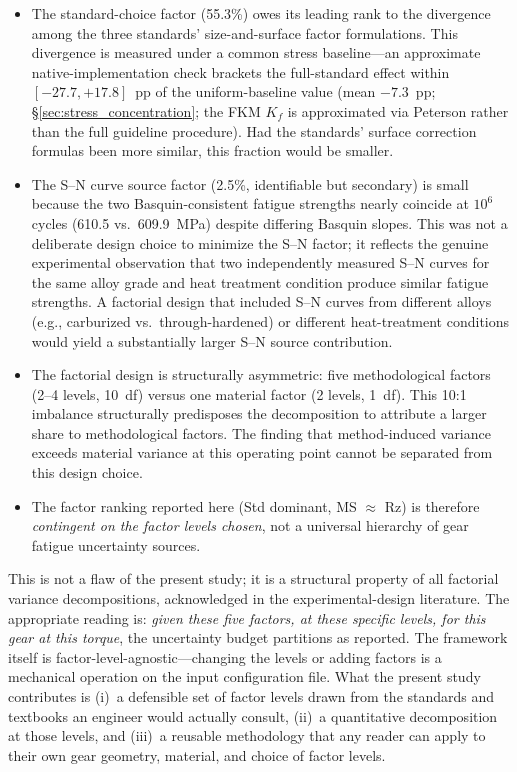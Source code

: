\documentclass[twocolumn,12pt,a4paper]{article}
\begin{document}
\begin{itemize}
  \item The standard-choice factor (55.3\%) owes its leading rank to the
        divergence among the three standards' size-and-surface factor
        formulations. This divergence is measured under a common stress
        baseline---an approximate native-implementation check brackets
        the full-standard effect within $[-27.7, +17.8]$~pp of the
        uniform-baseline value (mean $-7.3$~pp;
        \S\ref{sec:stress_concentration}; the FKM $K_f$ is
        approximated via Peterson rather than the full guideline
        procedure). Had the standards' surface
        correction formulas been more similar, this fraction would be
        smaller.

  \item The S--N curve source factor (2.5\%, identifiable but
        secondary) is small because the two Basquin-consistent
        fatigue strengths nearly coincide at $10^6$ cycles (610.5 vs.\
        609.9~MPa) despite differing Basquin slopes.
        This was not a deliberate design choice to minimize the S--N
        factor; it reflects the genuine experimental observation that two
        independently measured S--N curves for the same alloy grade and
        heat treatment condition produce similar fatigue strengths.
        A factorial design that included S--N curves from
        different alloys (e.g., carburized vs.\ through-hardened) or
        different heat-treatment conditions would yield a substantially
        larger S--N source contribution.

  \item The factorial design is structurally asymmetric: five
        methodological factors (2--4 levels, 10~df) versus one
        material factor (2 levels, 1~df). This 10:1 imbalance
        structurally predisposes the decomposition to attribute a
        larger share to methodological factors. The finding that
        method-induced variance exceeds material variance at this
        operating point cannot be separated from this design choice.

  \item The factor ranking reported here (Std dominant,
        MS $\approx$ Rz) is therefore \emph{contingent on the factor
        levels chosen}, not a universal hierarchy of gear fatigue
        uncertainty sources.
\end{itemize}

This is not a flaw of the present study; it is a structural property of
all factorial variance decompositions, acknowledged in the
experimental-design literature. The appropriate reading is: \emph{given
these five factors, at these specific levels, for this gear at this
torque}, the uncertainty budget partitions as reported. The framework
itself is factor-level-agnostic---changing the levels or adding factors
is a mechanical operation on the input configuration file. What the
present study contributes is (i)~a defensible set of factor levels
drawn from the standards and textbooks an engineer would actually
consult, (ii)~a quantitative decomposition at those levels, and
(iii)~a reusable methodology that any reader can apply to their own
gear geometry, material, and choice of factor levels.
\end{document}
